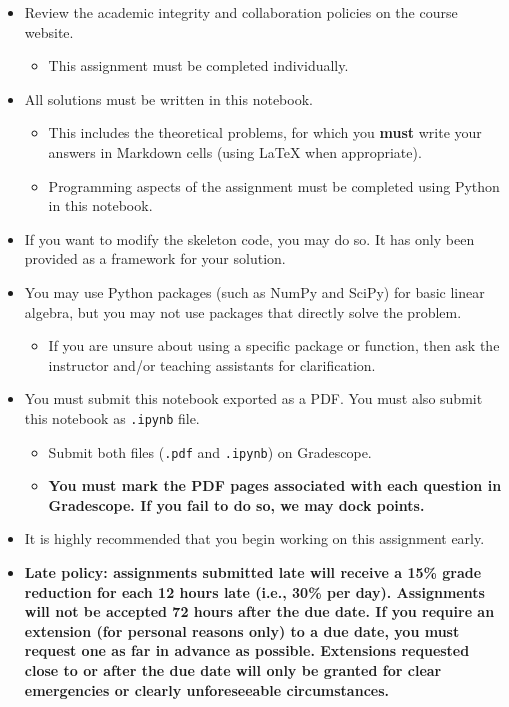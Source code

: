 \documentclass[11pt]{article}
\providecommand{\tightlist}{%
      \setlength{\itemsep}{0pt}\setlength{\parskip}{0pt}}
\begin{document}
\begin{itemize}
\tightlist
\item
  Review the academic integrity and collaboration policies on the course
  website.

  \begin{itemize}
  \tightlist
  \item
    This assignment must be completed individually.
  \end{itemize}
\item
  All solutions must be written in this notebook.

  \begin{itemize}
  \tightlist
  \item
    This includes the theoretical problems, for which you \textbf{must}
    write your answers in Markdown cells (using LaTeX when appropriate).
  \item
    Programming aspects of the assignment must be completed using Python
    in this notebook.
  \end{itemize}
\item
  If you want to modify the skeleton code, you may do so. It has only
  been provided as a framework for your solution.
\item
  You may use Python packages (such as NumPy and SciPy) for basic linear
  algebra, but you may not use packages that directly solve the problem.

  \begin{itemize}
  \tightlist
  \item
    If you are unsure about using a specific package or function, then
    ask the instructor and/or teaching assistants for clarification.
  \end{itemize}
\item
  You must submit this notebook exported as a PDF. You must also submit
  this notebook as \texttt{.ipynb} file.

  \begin{itemize}
  \tightlist
  \item
    Submit both files (\texttt{.pdf} and \texttt{.ipynb}) on Gradescope.
  \item
    \textbf{You must mark the PDF pages associated with each question in
    Gradescope. If you fail to do so, we may dock points.}
  \end{itemize}
\item
  It is highly recommended that you begin working on this assignment
  early.
\item
  \textbf{Late policy: assignments submitted late will receive a 15\%
  grade reduction for each 12 hours late (i.e., 30\% per day).
  Assignments will not be accepted 72 hours after the due date. If you
  require an extension (for personal reasons only) to a due date, you
  must request one as far in advance as possible. Extensions requested
  close to or after the due date will only be granted for clear
  emergencies or clearly unforeseeable circumstances.}
\end{itemize}
\end{document}
